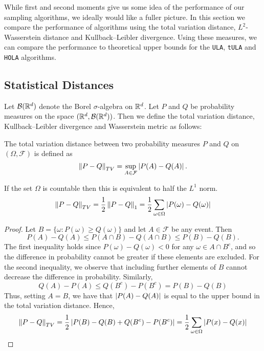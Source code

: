 While first and second moments give us some idea of the performance of our sampling algorithms, we ideally would like a fuller picture.  In this section we compare the performance of algorithms using the total variation distance, $L^2$-Wasserstein distance and Kullback--Leibler divergence.  Using these measures, we can compare the performance to theoretical upper bounds for the \texttt{ULA}, \texttt{tULA} and \texttt{HOLA} algorithms.

\subsection{Statistical Distances}
Let $\mathcal{B}(\mathbb{R}^d)$ denote the Borel $\sigma$-algebra on $\mathbb{R}^d$. Let $P$ and $Q$ be probability measures on the space $(\mathbb{R}^d, \mathcal{B}(\mathbb{R}^d))$.  Then we define the total variation distance, Kullback--Leibler divergence and Wasserstein metric as follows:

\begin{defn}
The total variation distance between two probability measures $P$ and $Q$ on $(\Omega, \mathcal{F})$ is defined as
$$
\norm{P - Q}_{TV} = \sup_{A \in \mathcal{F}} \abs{P(A) - Q(A)}.
$$
\end{defn}
\begin{prop}
If the set $\Omega$ is countable then this is equivalent to half the $L^1$ norm.
$$
\norm{P - Q}_{TV} = \frac{1}{2} \norm{P-Q}_1 = \frac{1}{2} \sum_{\omega \in \Omega} \abs{P(\omega) - Q(\omega)}
$$
\end{prop}
\begin{proof}
Let $B = \{\omega: P(\omega) \geq Q(\omega)\}$ and let $A \in \mathcal{F}$ be any event.  Then
$$
P(A) - Q(A) \leq P(A \cap B) - Q(A \cap B) \leq P(B) - Q(B).
$$
The first inequality holds since $P(\omega)-Q(\omega) < 0$ for any $\omega \in A \cap B^c$, and so the difference in probability cannot be greater if these elements are excluded.  For the second inequality, we observe that including further elements of $B$ cannot decrease the difference in probability.
Similarly,
$$
Q(A) - P(A) \leq Q(B^c) - P(B^c) = P(B) - Q(B)
$$
Thus, setting $A=B$, we have that $\abs{P(A)-Q(A)}$ is equal to the upper bound in the total variation distance.  Hence,
$$
\norm{P-Q}_{TV} = \frac{1}{2} \abs{P(B)-Q(B)+Q(B^c)-P(B^c)} = \frac{1}{2} \sum_{\omega \in \Omega} \abs{P(x)-Q(x)}
$$
\end{proof}

